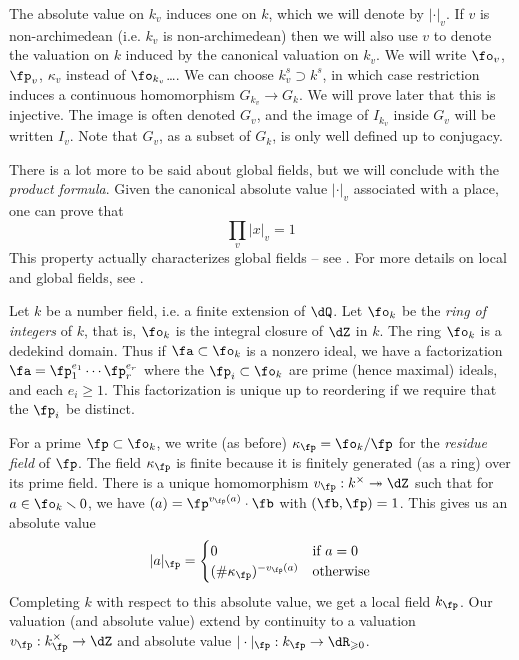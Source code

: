\documentclass{article}
\begin{document}
The absolute value on $k_v$ induces one on $k$, which we will denote by 
$|\cdot|_v$. If $v$ is non-archimedean (i.e. $k_v$ is non-archimedean) then we 
will also use $v$ to denote the valuation on $k$ induced by the canonical 
valuation on $k_v$. We will write $\fo_v$, $\fp_v$, $\kappa_v$ instead of 
$\fo_{k_v}$\ldots. We can choose $k_v^s\supset k^s$, in which case restriction 
induces a continuous homomorphism $G_{k_v} \to G_k$. We will prove later that 
this is injective. The image is often denoted $G_v$, and the image of 
$I_{k_v}$ inside $G_v$ will be written $I_v$. Note that $G_v$, as a subset of 
$G_k$, is only well defined up to conjugacy. 

There is a lot more to be said about global fields, but we will conclude with 
the \emph{product formula}. Given the canonical absolute value $|\cdot|_v$ 
associated with a place, one can prove that 
\[
  \prod_v |x|_v = 1
\]
This property actually characterizes global fields -- see \cite{ar45}. For 
more details on local and global fields, see \cite{we95}. 











Let $k$ be a number field, i.e. a finite extension of $\dQ$. Let $\fo_k$ be the 
\emph{ring of integers} of $k$, that is, $\fo_k$ is the integral closure of 
$\dZ$ in $k$. The ring $\fo_k$ is a dedekind domain. Thus if $\fa\subset \fo_k$ 
is a nonzero ideal, we have a factorization $\fa=\fp_1^{e_1}\dotsm \fp_r^{e_r}$ 
where the $\fp_i\subset\fo_k$ are prime (hence maximal) ideals, and each 
$e_i\geqslant 1$. This factorization is unique up to reordering if we require 
that the $\fp_i$ be distinct. 

For a prime $\fp\subset \fo_k$, we write (as before) $\kappa_\fp = \fo_k/\fp$ 
for the \emph{residue field} of $\fp$. The field $\kappa_\fp$ is finite because 
it is finitely generated (as a ring) over its prime field. There is a unique 
homomorphism $v_\fp:k^\times \twoheadrightarrow \dZ$ such that for 
$a\in \fo_k\smallsetminus 0$, we have $(a)=\fp^{v_\fp(a)}\cdot \fb$ with 
$(\fb,\fp)=1$. This gives us an absolute value 
\[
  |a|_\fp = \begin{cases}
              0 & \text{if $a=0$} \\
              (\# \kappa_\fp)^{-v_\fp(a)} & \text{otherwise}
            \end{cases}
\]
Completing $k$ with respect to this absolute value, we get a local field 
$k_\fp$. Our valuation (and absolute value) extend by continuity to a 
valuation $v_\fp:k_\fp^\times\to\dZ$ and absolute value 
$|\cdot|_\fp:k_\fp\to\dR_{\geqslant 0}$. 
\end{document}
